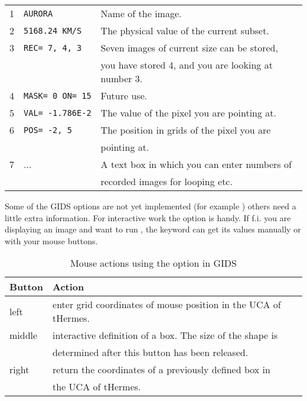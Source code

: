 \begin{tabular}{l | l | l}
1&{\tt AURORA}            & Name of the image.\\
2&{\tt 5168.24 KM/S}      & The physical value of the current subset.\\
3&{\tt REC=\ 7,\ 4,\ 3}   & Seven images of current size can be stored,\\
 &                        & you have stored 4, and you are looking at number 3.\\
4&{\tt MASK=\ 0\ ON=\ 15} & Future use.\\
5&{\tt VAL=\ -1.786E-2}   & The value of the pixel you are pointing at.\\
6&{\tt POS=\ -2,\ 5}      & The position in grids of the pixel you are \\
 &                        & pointing at.\\
7&...                     & A text box in which you can enter numbers of\\
 &                        & recorded images for looping etc.\\
\end{tabular}
\bigskip

Some of the GIDS options are not yet implemented 
(for example ) others need a little extra information.
For interactive work the  option is handy. If f.i. you are
displaying an image and want to run , the keyword 
can get its values manually or with your mouse buttons.

\begin{table}[h]
\begin{center}
\begin{tabular}{ | l | l | }
\hline
Button& Action\\
\hline
left   & enter grid coordinates of mouse position in the UCA of tHermes.\\ 
middle & interactive definition of a box. The size of the shape is\\
       & determined after this button has been released.\\
right  & return the coordinates of a previously defined box in\\
       & the UCA of tHermes.\\
\hline
\end{tabular}

\label{tab:cursor}

\caption{Mouse actions using the  option in GIDS}

\end{center}
\end{table}

